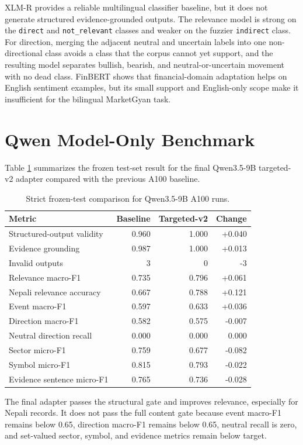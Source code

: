 \documentclass[12pt,a4paper]{report}
\begin{document}
XLM-R provides a reliable multilingual classifier baseline, but it does not generate structured evidence-grounded outputs. The relevance model is strong on the \texttt{direct} and \texttt{not\_relevant} classes and weaker on the fuzzier \texttt{indirect} class. For direction, merging the adjacent neutral and uncertain labels into one non-directional class avoids a class that the corpus cannot yet support, and the resulting model separates bullish, bearish, and neutral-or-uncertain movement with no dead class. FinBERT shows that financial-domain adaptation helps on English sentiment examples, but its small support and English-only scope make it insufficient for the bilingual MarketGyan task.

\section{Qwen Model-Only Benchmark}
Table \ref{tab:modelresults} summarizes the frozen test-set result for the final Qwen3.5-9B targeted-v2 adapter compared with the previous A100 baseline.

\begin{table}[htbp]
\centering
\caption{Strict frozen-test comparison for Qwen3.5-9B A100 runs.}
\label{tab:modelresults}
\small
\begin{tabular}{@{}lrrr@{}}
\toprule
Metric & Baseline & Targeted-v2 & Change \\
\midrule
Structured-output validity & 0.960 & 1.000 & +0.040 \\
Evidence grounding & 0.987 & 1.000 & +0.013 \\
Invalid outputs & 3 & 0 & -3 \\
Relevance macro-F1 & 0.735 & 0.796 & +0.061 \\
Nepali relevance accuracy & 0.667 & 0.788 & +0.121 \\
Event macro-F1 & 0.597 & 0.633 & +0.036 \\
Direction macro-F1 & 0.582 & 0.575 & -0.007 \\
Neutral direction recall & 0.000 & 0.000 & 0.000 \\
Sector micro-F1 & 0.759 & 0.677 & -0.082 \\
Symbol micro-F1 & 0.815 & 0.793 & -0.022 \\
Evidence sentence micro-F1 & 0.765 & 0.736 & -0.028 \\
\bottomrule
\end{tabular}
\end{table}

The final adapter passes the structural gate and improves relevance, especially for Nepali records. It does not pass the full content gate because event macro-F1 remains below 0.65, direction macro-F1 remains below 0.65, neutral recall is zero, and set-valued sector, symbol, and evidence metrics remain below target.
\end{document}
